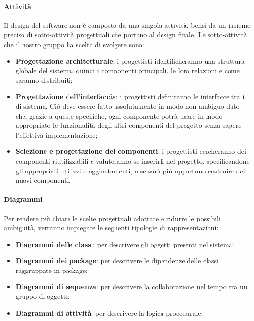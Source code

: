 \paragraph{Attività}\Spazio
Il design del software non è composto da una singola attività, bensì da un insieme preciso di sotto-attività progettuali che portano al design finale.
Le sotto-attività che il nostro gruppo ha scelto di svolgere sono:
	\begin{itemize}
	\item\textbf{{Progettazione architetturale}}: i progettisti identificheranno una struttura globale del sistema, quindi i componenti principali, le loro relazioni e come saranno distribuiti;
	\item\textbf{{Progettazione dell'interfaccia}}: i progettisti definiranno le interfacce tra i  di sistema. Ciò deve essere fatto assolutamente in modo non ambiguo dato che, grazie a queste specifiche, ogni componente potrà usare in modo appropriato le funzionalità degli altri componenti del progetto senza sapere l'effettiva implementazione;
	\item\textbf{{Selezione e progettazione dei componenti}}: i progettisti cercheranno dei componenti riutilizzabili e valuteranno se inserirli nel progetto, specificandone gli appropriati utilizzi e aggiustamenti, o se sarà più opportuno costruire dei nuovi componenti.
\end{itemize}
\paragraph{Diagrammi}\Spazio
Per rendere più chiare le scelte progettuali adottate e ridurre le possibili ambiguità, verranno impiegate le seguenti tipologie di rappresentazioni:
\begin{itemize}
	\item \textbf{Diagrammi delle classi}: per descrivere gli oggetti presenti nel sistema;
	\item \textbf{Diagrammi dei package}: per descrivere le dipendenze delle classi raggruppate in package;
	\item \textbf{Diagrammi di sequenza}: per descrivere la collaborazione nel tempo tra un gruppo di oggetti;
	\item \textbf{Diagrammi di attività}: per descrivere la logica procedurale.
\end{itemize}
